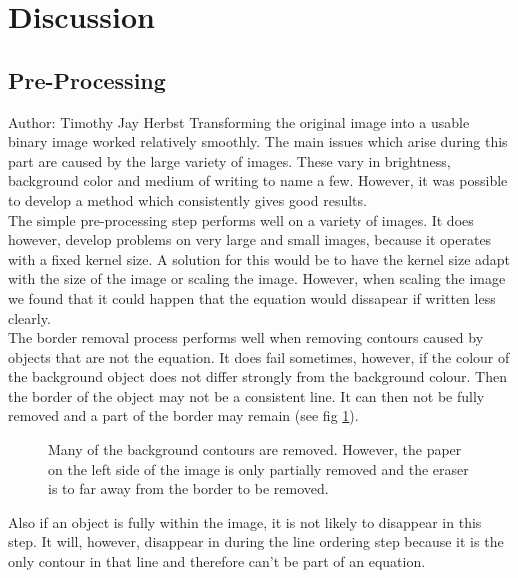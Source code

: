 \documentclass[12pt]{article}
\begin{document}
	\section{Discussion}
	
	\subsection{Pre-Processing}
	\small{Author: Timothy Jay Herbst} \newline \newline
	Transforming the original image into a usable binary image worked relatively smoothly.
	The main issues which arise during this part are caused by the large variety of images.
	These vary in brightness, background color and medium of writing to name a few.
	However, it was possible to develop a method which consistently gives good results.\\
	The simple pre-processing step performs well on a variety of images.
	It does however, develop problems on very large and small images, because it operates with a fixed kernel size.
	A solution for this would be to have the kernel size adapt with the size of the image or scaling the image.
	However, when scaling the image we found that it could happen that the equation would dissapear if written less clearly.\\
	The border removal process performs well when removing contours caused by objects that are not the equation.
	It does fail sometimes, however, if the colour of the background object does not differ strongly from the background colour.
	Then the border of the object may not be a consistent line.
	It can then not be fully removed and a part of the border may remain (see fig \ref{fig:PartialBorder}).
	\begin{figure}[htp]
		\centering
		
		\caption{Many of the background contours are removed.
		However, the paper on the left side of the image is only partially removed and the eraser is to far away from the border to be removed.}
		\label{fig:PartialBorder}
	\end{figure}
	Also if an object is fully within the image, it is not likely to disappear in this step.
	It will, however, disappear in during the line ordering step because it is the only contour in that line and therefore can't be part of an equation.\\
	
\end{document}
